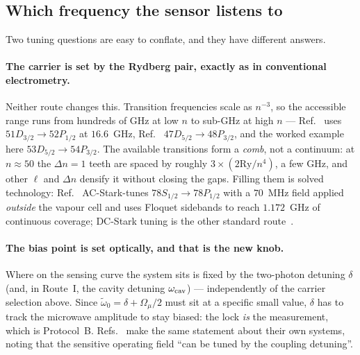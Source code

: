 \documentclass[11pt,a4paper]{article}
\newcommand{\Omu}{\Omega_{\mu}}
\newcommand{\wt}{\tilde{\omega}_{0}}
\begin{document}
\subsection{Which frequency the sensor listens to}
\label{sec:tuning}

Two tuning questions are easy to conflate, and they have different answers.

\paragraph{The carrier is set by the Rydberg pair, exactly as in conventional electrometry.}
Neither route changes this. Transition frequencies scale as $n^{-3}$, so the accessible range
runs from hundreds of GHz at low $n$ to sub-GHz at high $n$ --- Ref.~\cite{Ding2022} uses
$51D_{3/2}\!\to\!52P_{1/2}$ at $16.6$~GHz, Ref.~\cite{Wang2025} $47D_{5/2}\!\to\!48P_{3/2}$,
and the worked example here $53D_{5/2}\!\to\!54P_{3/2}$. The available transitions form a
\emph{comb}, not a continuum: at $n\approx50$ the $\Delta n=1$ teeth are spaced by roughly
$3\times(2\mathrm{Ry}/n^4)$, a few GHz, and other $\ell$ and $\Delta n$ densify it without
closing the gaps. Filling them is solved technology: Ref.~\cite{Floquet2024} AC-Stark-tunes
$78S_{1/2}\!\to\!78P_{1/2}$ with a $70$~MHz field applied \emph{outside} the vapour cell and
uses Floquet sidebands to reach $1.172$~GHz of continuous coverage; DC-Stark tuning is the
other standard route~\cite{DCStark2026}.

\paragraph{The bias point is set optically, and that is the new knob.} Where on the sensing
curve the system sits is fixed by the two-photon detuning $\delta$ (and, in Route~I, the
cavity detuning $\omega_{\rm cav}$) --- independently of the carrier selection above. Since
$\wt=\delta+\Omu/2$ must sit at a specific small value, $\delta$ has to track the microwave
amplitude to stay biased: the lock \emph{is} the measurement, which is Protocol~B.
Refs.~\cite{Ding2022,Wang2025} make the same statement about their own systems, noting that
the sensitive operating field ``can be tuned by the coupling detuning''.
\end{document}
